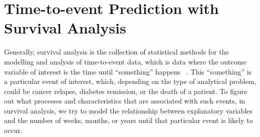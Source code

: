 \chapter{Time-to-event Prediction with Survival Analysis}
\label{survival-analysis}


Generally, 
survival analysis is the collection of statistical methods
for the modelling and analysis of time-to-event data,
which is data where the outcome variable of interest 
is the time until \enquote{something} happens~%
\autocite{kleinbaumSurvival2011}.
This \enquote{something} is a particular event of interest,
which, depending on the type of analytical problem, 
could be cancer relapse, 
diabetes remission,
or the death of a patient.
To figure out what processes and characteristics 
that are associated with such events, 
in survival analysis, we try to model the relationship between
explanatory variables and the number of weeks, months, or years 
until that particular event is likely to occur. 


